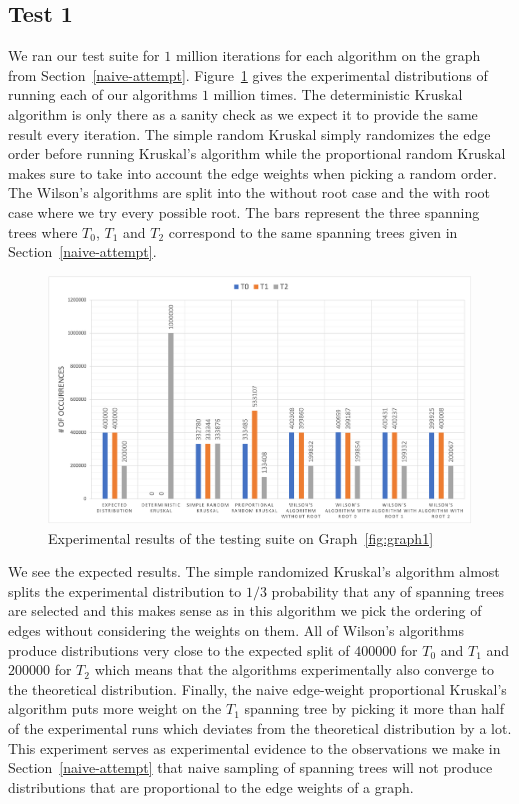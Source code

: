 \documentclass[11pt]{article}
\begin{document}
\subsection{Test 1}

We ran our test suite for $1$ million iterations for each algorithm on the graph from Section~\ref{naive-attempt}. Figure~\ref{fig1} gives the experimental distributions of running each of our algorithms $1$ million times. The deterministic Kruskal algorithm is only there as a sanity check as we expect it to provide the same result every iteration. The simple random Kruskal simply randomizes the edge order before running Kruskal's algorithm while the proportional random Kruskal makes sure to take into account the edge weights when picking a random order. The Wilson's algorithms are split into the without root case and the with root case where we try every possible root. The bars represent the three spanning trees where $T_0$, $T_1$ and $T_2$ correspond to the same spanning trees given in Section~\ref{naive-attempt}.

\begin{figure}[ht]
\includegraphics[scale=0.60]{figs/fig1.png}
\caption{Experimental results of the testing suite on Graph~\ref{fig:graph1}}
\centering
\label{fig1}
\end{figure}

We see the expected results. The simple randomized Kruskal's algorithm almost splits the experimental distribution to $1/3$ probability that any of spanning trees are selected and this makes sense as in this algorithm we pick the ordering of edges without considering the weights on them. All of Wilson's algorithms produce distributions very close to the expected split of $400000$ for $T_0$ and $T_1$ and $200000$ for $T_2$ which means that the algorithms experimentally also converge to the theoretical distribution. Finally, the naive edge-weight proportional Kruskal's algorithm puts more weight on the $T_1$ spanning tree by picking it more than half of the experimental runs which deviates from the theoretical distribution by a lot. This experiment serves as experimental evidence to the observations we make in Section~\ref{naive-attempt} that naive sampling of spanning trees will not produce distributions that are proportional to the edge weights of a graph.
\end{document}
